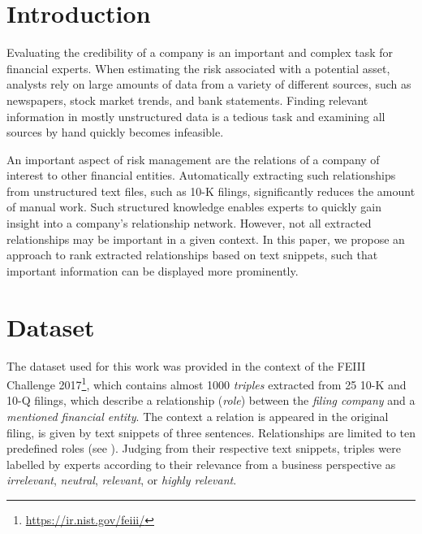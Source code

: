 \section{Introduction}

Evaluating the credibility of a company is an important and complex task for financial experts.
When estimating the risk associated with a potential asset, analysts rely on large amounts of data from a variety of different sources, such as newspapers, stock market trends, and bank statements.
Finding relevant information in mostly unstructured data is a tedious task and examining all sources by hand quickly becomes infeasible.

An important aspect of risk management are the relations of a company of interest to other financial entities.
Automatically extracting such relationships from unstructured text files, such as 10-K filings, significantly reduces the amount of manual work.
Such structured knowledge enables experts to quickly gain insight into a company's relationship network.
However, not all extracted relationships may be important in a given context.
In this paper, we propose an approach to rank extracted relationships based on text snippets, such that important information can be displayed more prominently.


\section{Dataset}
The dataset used for this work was provided in the context of the FEIII Challenge 2017\footnote{\url{https://ir.nist.gov/feiii/}}, which contains almost 1000 \emph{triples} extracted from 25 10-K and 10-Q filings, which describe a relationship (\emph{role}) between the \emph{filing company} and a \emph{mentioned financial entity}.
The context a relation is appeared in the original filing, is given by text snippets of three sentences.
Relationships are limited to ten predefined roles (see ).
Judging from their respective text snippets, triples were labelled by experts according to their relevance from a business perspective as \emph{irrelevant}, \emph{neutral}, \emph{relevant}, or \emph{highly relevant}.

